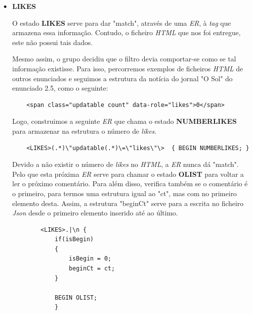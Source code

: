 \documentclass[a4paper,12pt]{report}
\begin{document}
\begin{itemize}
    \item 
    \textbf{LIKES}
    \par O estado \textbf{LIKES} serve para dar "match", através de uma \textit{ER}, à \textit{tag} que armazena essa informação. Contudo, o ficheiro \textit{HTML} que nos foi entregue, este não possui tais dados.
    \par Mesmo assim, o grupo decidiu que o filtro devia comportar-se como se tal informação existisse. Para isso, percorremos exemplos de ficheiros \textit{HTML} de outros enunciados e seguimos a estrutura da notícia do jornal "O Sol" do enunciado 2.5, como o seguinte:
    
    \vspace{0.2cm}
    
\begin{verbatim}
    <span class="updatable count" data-role="likes">0</span>
\end{verbatim}

    \par Logo, construimos a seguinte \textit{ER} que chama o estado \textbf{NUMBERLIKES} para armazenar na estrutura o número de \textit{likes}.
    
    \begin{verbatim}
    <LIKES>(.*)\"updatable(.*)\=\"likes\"\>  { BEGIN NUMBERLIKES; }
    \end{verbatim}
    
    \par Devido a não existir o número de \textit{likes} no \textit{HTML}, a \textit{ER} nunca dá "match". Pelo que esta próxima \textit{ER} serve para chamar o estado \textbf{OLIST} para voltar a ler o próximo comentário. Para além disso, verifica também se o comentário é o primeiro, para termos uma estrutura igual ao "ct", mas com no primeiro elemento desta. Assim, a estrutura "beginCt" serve para a escrita no ficheiro \textit{Json} desde o primeiro elemento inserido até ao último.
    
    \begin{verbatim}
        <LIKES>.|\n { 
            if(isBegin)
            {
                isBegin = 0;
                beginCt = ct;
            }
            
            BEGIN OLIST; 
            }
    \end{verbatim}
    
\end{itemize}

\vspace{1cm}
\end{document}
